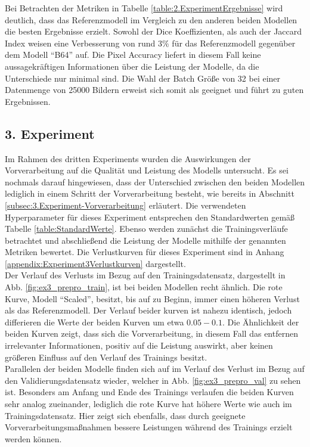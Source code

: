 Bei Betrachten der Metriken in Tabelle \ref{table:2.ExperimentErgebnisse} wird deutlich, dass das Referenzmodell im Vergleich zu den anderen beiden Modellen die besten Ergebnisse erzielt. Sowohl der Dice Koeffizienten, als auch der Jaccard Index weisen eine Verbesserung von rund $3\%$ für das Referenzmodell gegenüber dem Modell ``B64'' auf. Die Pixel Accuracy liefert in diesem Fall keine aussagekräftigen Informationen über die Leistung der Modelle, da die Unterschiede nur minimal sind. Die Wahl der Batch Größe von 32 bei einer Datenmenge von 25000 Bildern erweist sich somit als geeignet und führt zu guten Ergebnissen.


\subsection{3. Experiment}
Im Rahmen des dritten Experiments wurden die Auswirkungen der Vorverarbeitung auf die Qualität und Leistung des Modells untersucht. Es sei nochmals darauf hingewiesen, dass der Unterschied zwischen den beiden Modellen lediglich in einem Schritt der Vorverarbeitung besteht, wie bereits in Abschnitt \ref{subsec:3.Experiment-Vorverarbeitung} erläutert. Die verwendeten Hyperparameter für dieses Experiment entsprechen den Standardwerten gemäß Tabelle \ref{table:StandardWerte}. Ebenso werden zunächst die Trainingsverläufe betrachtet und abschließend die Leistung der Modelle mithilfe der genannten Metriken bewertet. Die Verlustkurven für dieses Experiment sind in Anhang \ref{appendix:Experiment3Verlustkurven} dargestellt.\\
Der Verlauf des Verlusts im Bezug auf den Trainingsdatensatz, dargestellt in Abb. \ref{fig:ex3_prepro_train}, ist bei beiden Modellen recht ähnlich. Die rote Kurve, Modell ``Scaled'', besitzt, bis auf zu Beginn, immer einen höheren Verlust als das Referenzmodell. Der Verlauf beider kurven ist nahezu identisch, jedoch differieren die Werte der beiden Kurven um etwa $0.05 - 0.1$. Die Ähnlichkeit der beiden Kurven zeigt, dass sich die Vorverarbeitung, in diesem Fall das entfernen irrelevanter Informationen, positiv auf die Leistung auswirkt, aber keinen größeren Einfluss auf den Verlauf des Trainings besitzt.\\
Parallelen der beiden Modelle finden sich auf im Verlauf des Verlust im Bezug auf den Validierungsdatensatz wieder, welcher in Abb. \ref{fig:ex3_prepro_val} zu sehen ist. Besonders am Anfang und Ende des Trainings verlaufen die beiden Kurven sehr analog zueinander, lediglich die rote Kurve hat höhere Werte wie auch im Trainingsdatensatz. Hier zeigt sich ebenfalls, dass durch geeignete Vorverarbeitungsmaßnahmen bessere Leistungen während des Trainings erzielt werden können.

